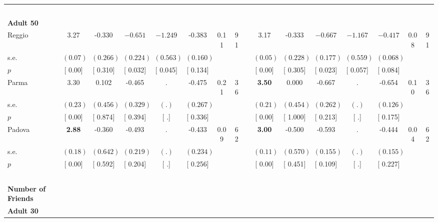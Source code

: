 \begin{longtable}{L{8em} c c c c c c c p{1em} c c c c c c c}
~\\[1em]
\quad \quad \textbf{Adult 50} & & & & & & & & & & & & & & & \\* 
\quad \quad \quad Reggio& 3.27 &    -0.330 & $ \mathbf{   -0.651}$ & $ \mathbf{   -1.249}$ &    -0.383 &      0.11 &        91 & & 3.17 &    -0.333 & $ \mathbf{   -0.667}$ & $ \mathbf{   -1.167}$ & $ \mathbf{   -0.417}$ &      0.08 &        91  \\*
\quad \quad \quad \quad s.e.& $ (     0.07)$ & $ (    0.266)$ & $ (    0.224)$ & $ (    0.563)$ & $ (    0.160)$ & & & & $ (     0.05)$ & $ (    0.228)$ & $ (    0.177)$ & $ (    0.559)$ & $ (    0.068)$ & &  \\*
\quad \quad \quad \quad $ p$ & [     0.00] & [    0.310] & [    0.032] & [    0.045] & [    0.134] & & & & [     0.00] & [    0.305] & [    0.023] & [    0.057] & [    0.084] & &  \\[1em]
\quad \quad \quad Parma& 3.30 &     0.102 &    -0.465 &         . &    -0.475 &      0.21 &        36 & & \textbf{     3.50} &     0.000 &    -0.667 &         . &    -0.654 &      0.10 &        36  \\*
\quad \quad \quad \quad s.e.& $ (     0.23)$ & $ (    0.456)$ & $ (    0.329)$ & $ (        .)$ & $ (    0.267)$ & & & & $ (     0.21)$ & $ (    0.454)$ & $ (    0.262)$ & $ (        .)$ & $ (    0.126)$ & &  \\*
\quad \quad \quad \quad $ p$ & [     0.00] & [    0.874] & [    0.394] & [        .] & [    0.336] & & & & [     0.00] & [    1.000] & [    0.213] & [        .] & [    0.175] & &  \\[1em]
\quad \quad \quad Padova& \textbf{     2.88} &    -0.360 &    -0.493 &         . &    -0.433 &      0.09 &        62 & & \textbf{     3.00} &    -0.500 &    -0.593 &         . &    -0.444 &      0.04 &        62  \\*
\quad \quad \quad \quad s.e.& $ (     0.18)$ & $ (    0.642)$ & $ (    0.219)$ & $ (        .)$ & $ (    0.234)$ & & & & $ (     0.11)$ & $ (    0.570)$ & $ (    0.155)$ & $ (        .)$ & $ (    0.155)$ & &  \\*
\quad \quad \quad \quad $ p$ & [     0.00] & [    0.592] & [    0.204] & [        .] & [    0.256] & & & & [     0.00] & [    0.451] & [    0.109] & [        .] & [    0.227] & &  \\[1em]
~\\[1em]
\textbf{Number of Friends} \\*
\quad \quad \textbf{Adult 30} & & & & & & & & & & & & & & & \\* 

\end{longtable}

